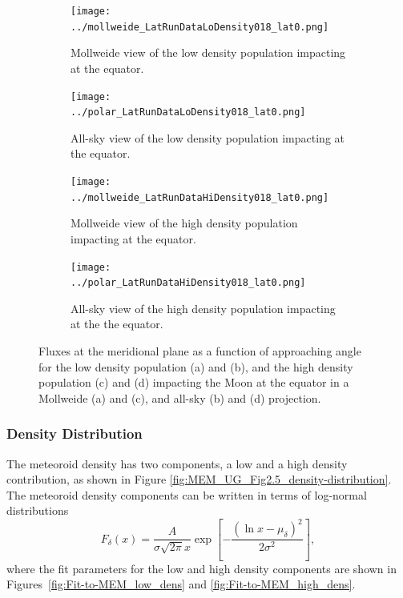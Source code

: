 \documentclass{article}
\begin{document}
\begin{figure}[!htb]
	\begin{subfigure}{.485\textwidth}
		\centering
		\texttt{[image: ../mollweide\_LatRunDataLoDensity018\_lat0.png]}  
		\caption{Mollweide view of the low density population impacting at the equator.}
		\label{fig:mollweide_LatRunDataLiDensity018_lat-0}
	\end{subfigure}
	\begin{subfigure}{.485\textwidth}
		\centering
		\texttt{[image: ../polar\_LatRunDataLoDensity018\_lat0.png]}  
		\caption{All-sky view of the low density population impacting at the equator.}
		\label{fig:polar_LatRunDataLoDensity018_lat-0}
	\end{subfigure}
	\newline
	\begin{subfigure}{.485\textwidth}
		\centering
		\texttt{[image: ../mollweide\_LatRunDataHiDensity018\_lat0.png]}  
		\caption{Mollweide view of the high density population impacting at the equator.}
		\label{fig:mollweide_LatRunDataHiDensity018_lat-0}
	\end{subfigure}
	\begin{subfigure}{.485\textwidth}
		\centering
		\texttt{[image: ../polar\_LatRunDataHiDensity018\_lat0.png]}  
		\caption{All-sky view of the high density population impacting at the the equator.}
		\label{fig:polar_LatRunDataHiDensity018_lat-0}
	\end{subfigure}
	\caption{Fluxes at the meridional plane as a function of approaching angle for the low density population (a) and (b), and the high density population (c) and (d) impacting the Moon at the equator in a Mollweide (a) and (c), and all-sky (b) and (d) projection.}
	\label{fig:MEM angular dist at equator}
\end{figure}
\clearpage



\subsubsection{Density Distribution}



The meteoroid density has two components, a low and a high density contribution, as shown in Figure \ref{fig:MEM_UG_Fig2.5_density-distribution}. The meteoroid density components can be written in terms of log-normal distributions
\begin{equation}\label{eq:log-normal_distribution}
F_\delta(x) = \frac{A}{\sigma\sqrt{2\pi}x}\exp\left[-\frac{(\ln x-\mu_\delta)^2}{2\sigma^2}\right],
\end{equation}
where the fit parameters for the low and high density components are shown in Figures~\ref{fig:Fit-to-MEM_low_dens} and \ref{fig:Fit-to-MEM_high_dens}. %
\end{document}
